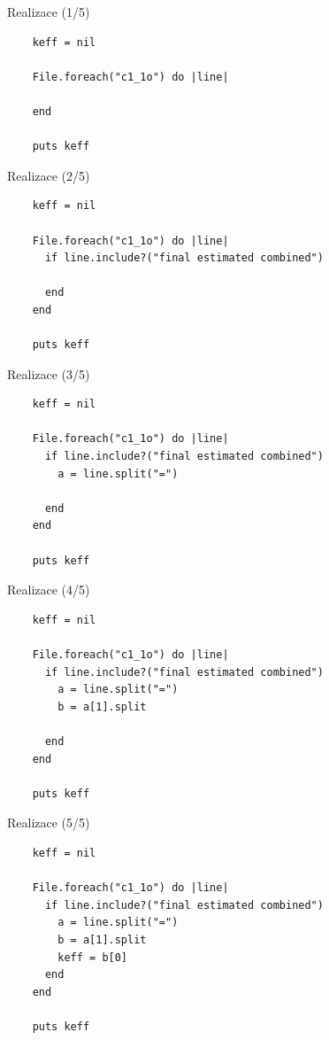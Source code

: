 \documentclass{beamer}
\begin{document}
\begin{frame}[fragile]{Realizace (1/5)}
  \scriptsize
  \begin{verbatim}
    keff = nil

    File.foreach("c1_1o") do |line|

    end

    puts keff
  \end{verbatim}
\end{frame}

\begin{frame}[fragile]{Realizace (2/5)}
  \scriptsize
  \begin{verbatim}
    keff = nil

    File.foreach("c1_1o") do |line|
      if line.include?("final estimated combined")

      end
    end

    puts keff
  \end{verbatim}
\end{frame}

\begin{frame}[fragile]{Realizace (3/5)}
  \scriptsize
  \begin{verbatim}
    keff = nil

    File.foreach("c1_1o") do |line|
      if line.include?("final estimated combined")
        a = line.split("=")

      end
    end

    puts keff
  \end{verbatim}
\end{frame}

\begin{frame}[fragile]{Realizace (4/5)}
  \scriptsize
  \begin{verbatim}
    keff = nil

    File.foreach("c1_1o") do |line|
      if line.include?("final estimated combined")
        a = line.split("=")
        b = a[1].split

      end
    end

    puts keff
  \end{verbatim}
\end{frame}

\begin{frame}[fragile]{Realizace (5/5)}
  \scriptsize
  \begin{verbatim}
    keff = nil

    File.foreach("c1_1o") do |line|
      if line.include?("final estimated combined")
        a = line.split("=")
        b = a[1].split
        keff = b[0]
      end
    end

    puts keff
  \end{verbatim}
\end{frame}
\end{document}
